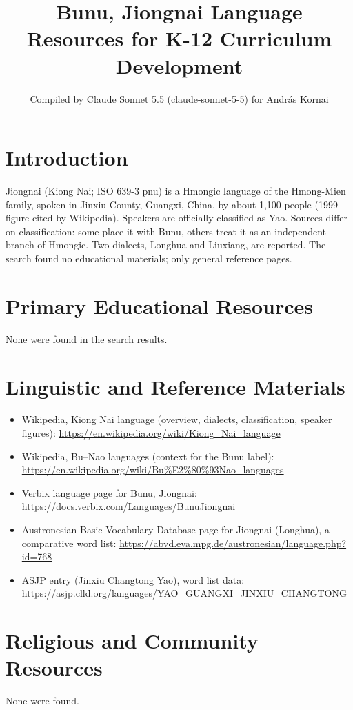 \documentclass[12pt]{article}
\title{Bunu, Jiongnai Language Resources for K-12 Curriculum Development}
\author{Compiled by Claude Sonnet 5.5 (claude-sonnet-5-5) for Andr\'as Kornai}
\date{}
\begin{document}
\maketitle

\section{Introduction}
Jiongnai (Kiong Nai; ISO 639-3 pnu) is a Hmongic language of the Hmong-Mien family, spoken in Jinxiu County, Guangxi, China, by about 1,100 people (1999 figure cited by Wikipedia). Speakers are officially classified as Yao. Sources differ on classification: some place it with Bunu, others treat it as an independent branch of Hmongic. Two dialects, Longhua and Liuxiang, are reported. The search found no educational materials; only general reference pages.

\section{Primary Educational Resources}
None were found in the search results.

\section{Linguistic and Reference Materials}
\begin{itemize}
\item Wikipedia, Kiong Nai language (overview, dialects, classification, speaker figures): \url{https://en.wikipedia.org/wiki/Kiong_Nai_language}
\item Wikipedia, Bu--Nao languages (context for the Bunu label): \url{https://en.wikipedia.org/wiki/Bu%E2%80%93Nao_languages}
\item Verbix language page for Bunu, Jiongnai: \url{https://docs.verbix.com/Languages/BunuJiongnai}
\item Austronesian Basic Vocabulary Database page for Jiongnai (Longhua), a comparative word list: \url{https://abvd.eva.mpg.de/austronesian/language.php?id=768}
\item ASJP entry (Jinxiu Changtong Yao), word list data: \url{https://asjp.clld.org/languages/YAO_GUANGXI_JINXIU_CHANGTONG}
\end{itemize}

\section{Religious and Community Resources}
None were found.
\end{document}
